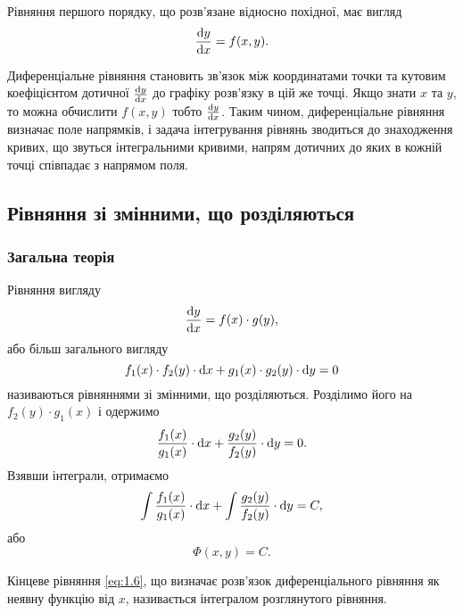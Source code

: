 Рівняння першого порядку, що розв’язане відносно похідної, має вигляд
\begin{equation}
	\label{eq:1.1}
	\frac{\mathop{}\!\mathrm{d} y}{\mathop{}\!\mathrm{d} x} = f(x, y).	
\end{equation}

Диференціальне рівняння становить зв’язок між координатами точки та кутовим коефіцієнтом дотичної $\frac{\mathop{}\!\mathrm{d} y}{\mathop{}\!\mathrm{d} x}$ до графіку розв’язку в цій же точці. Якщо знати $x$ та $y$, то можна обчислити $f(x, y)$ тобто $\frac{\mathop{}\!\mathrm{d} y}{\mathop{}\!\mathrm{d} x}$. Таким чином, диференціальне рівняння визначає поле напрямків, і задача інтегрування рівнянь зводиться до знаходження кривих, що звуться інтегральними кривими, напрям дотичних до яких в кожній точці співпадає з напрямом поля.

\subsection{Рівняння зі змінними, що розділяються}

\subsubsection{Загальна теорія}

Рівняння вигляду
\begin{equation}
	\label{eq:1.2}
	\frac{\mathop{}\!\mathrm{d} y}{\mathop{}\!\mathrm{d} x} = f(x) \cdot g(y),
\end{equation}
або більш загального вигляду
\begin{equation}
	\label{eq:1.3}
	f_1(x) \cdot f_2(y) \cdot \mathop{}\!\mathrm{d} x + g_1(x) \cdot g_2(y) \cdot \mathop{}\!\mathrm{d} y = 0
\end{equation}
називаються рівняннями зі змінними, що розділяються. Розділимо його на $f_2(y) \cdot g_1(x)$ і одержимо
\begin{equation}
	\label{eq:1.4}
	\frac{f_1(x)}{g_1(x)} \cdot \mathop{}\!\mathrm{d} x + \frac{g_2(y)}{f_2(y)} \cdot \mathop{}\!\mathrm{d} y = 0.
\end{equation}
Взявши інтеграли, отримаємо
\begin{equation}
	\label{eq:1.5}
	\int \frac{f_1(x)}{g_1(x)} \cdot \mathop{}\!\mathrm{d} x + \int \frac{g_2(y)}{f_2(y)} \cdot \mathop{}\!\mathrm{d} y = C,
\end{equation}
або 
\begin{equation}
	\label{eq:1.6}
	\Phi(x, y) = C.
\end{equation}

\begin{definition}
	Кінцеве рівняння \eqref{eq:1.6}, що визначає розв’язок диференціального рівняння як неявну функцію від $x$, називається інтегралом розглянутого рівняння.
\end{definition}

